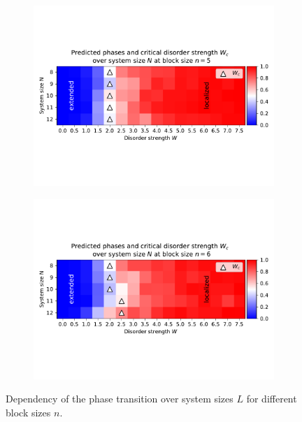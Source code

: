 \documentclass[reprint,amsmath,amssymb,aps,prb]{revtex4-2}
\begin{document}
\begin{center}
\begin{figure}[H]
\begin{subfigure}[c]{0.4\textwidth}
			\includegraphics[width=\textwidth]{../results/Wc/n5_Wc_N_dependency.pdf}
		\end{subfigure}
		\begin{subfigure}[c]{0.4\textwidth}
			\includegraphics[width=\textwidth]{../results/Wc/n6_Wc_N_dependency.pdf}
		\end{subfigure}
		\caption{Dependency of the phase transition over system sizes $L$ for different block sizes $n$.}
		\label{fig:wcextract}
	\end{figure}
\end{center}
\twocolumngrid

\end{document}
